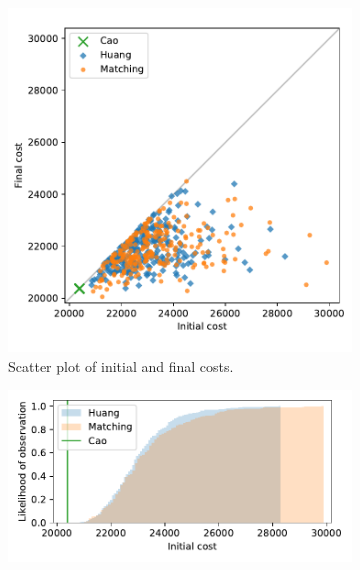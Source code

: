 \documentclass[11pt]{article}
\begin{document}
\begin{figure}
    \begin{subfigure}{.5\textwidth}
        \includegraphics[width=\linewidth]{Fig2a.pdf}
        \caption{Scatter plot of initial and final costs.}
    \end{subfigure}
    \hfill%
    \begin{subfigure}{.5\textwidth}
        \includegraphics[width=\linewidth]{Fig2b1.pdf}


\end{subfigure}
\end{figure}
\end{document}
